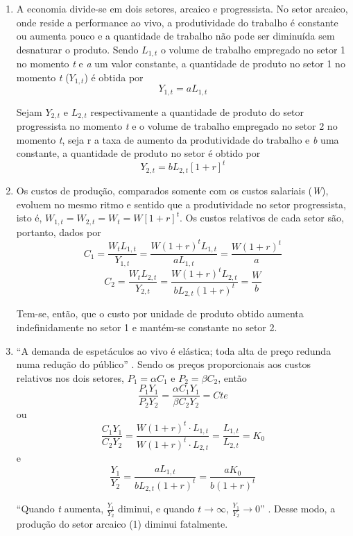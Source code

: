 \documentclass[a4paper, 12pt, openright, oneside, german, french, english, brazil]{abntex2}
\begin{document}
	\begin{enumerate}
		\item A economia divide-se em dois setores, arcaico e progressista. No setor arcaico, onde reside a performance ao vivo, a produtividade do trabalho é constante ou aumenta pouco e a quantidade de trabalho não pode ser diminuída sem desnaturar o produto. Sendo $L_{1,t}$ o volume de trabalho empregado no setor 1 no momento \textit{t} e \textit{a} um valor constante, a quantidade de produto no setor 1 no momento \textit{t} ($Y_{1,t}$) é obtida por $$Y_{1,t} = aL_{1,t}$$
		
		Sejam $Y_{2,t}$ e $L_{2,t}$ respectivamente a quantidade de produto do setor progressista no momento \textit{t} e o volume de trabalho empregado no setor 2 no momento \textit{t}, seja r a taxa de aumento da produtividade do trabalho e \textit{b} uma constante, a quantidade de produto no setor é obtido por $$Y_{2,t} = bL_{2,t}[1+r]^t $$
		
		\item Os custos de produção, comparados somente com os custos salariais (\textit{W}), evoluem no mesmo ritmo e sentido que a produtividade no setor progressista, isto é, $W_{1,t} = W_{2,t} = W_t = W[1+r]^t$. Os custos relativos de cada setor são, portanto, dados por
		$$C_1 = \frac{W_tL_{1,t}}{Y_{1,t}} = \frac{W(1+r)^tL_{1,t}}{aL_{1,t}} = \frac{W(1+r)^t}{a}$$
		$$C_2 = \frac{W_tL_{2,t}}{Y_{2,t}} = \frac{W(1+r)^tL_{2,t}}{bL_{2,t}(1+r)^t} = \frac{W}{b}$$
		
		Tem-se, então, que o custo por unidade de produto obtido aumenta indefinidamente no setor 1 e mantém-se constante no setor 2.
		
		\item ``A demanda de espetáculos ao vivo é elástica; toda alta de preço redunda numa redução do público'' \cite[p. 56]{benhamou2007economia}. Sendo os preços proporcionais aos custos relativos nos dois setores, $P_1 = \alpha C_1$ e $P_2 = \beta C_2$, então
		$$\frac{P_1Y_1}{P_2Y_2} = \frac{\alpha C_1Y_1}{\beta C_2Y_2} = Cte$$ ou
		$$\frac{C_1Y_1}{C_2Y_2} = \frac{W(1+r)^t \cdot L_{1,t}}{W(1+r)^t \cdot L_{2,t}} = \frac{L_{1,t}}{L_{2,t}} = K_0$$ e
		$$\frac{Y_1}{Y_2} = \frac{aL_{1,t}}{bL_{2,t}(1+r)^t} = \frac{aK_0}{b(1+r)^t}$$
		
		``Quando \textit{t} aumenta, $\frac{Y_1}{Y_2}$ diminui, e quando $t \rightarrow \infty$, $\frac{Y_1}{Y_2} \rightarrow 0$'' \cite[p. 57]{benhamou2007economia}. Desse modo, a produção do setor arcaico (1) diminui fatalmente.
	\end{enumerate}
	
\end{document}
